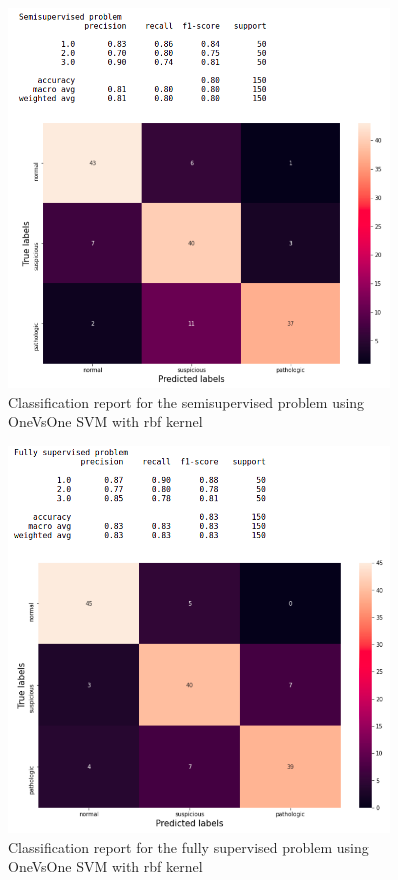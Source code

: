 \documentclass[a4paper,12pt]{article}
\begin{document}
\begin{figure}[H]
  \begin{center}
  \includegraphics[width=0.9\textwidth]{images/semi.png}
  \end{center}
  \caption{Classification report for the semisupervised problem using OneVsOne SVM with rbf kernel}
  \label{fig:semi}
\end{figure}

\begin{figure}[H]
  \begin{center}
  \includegraphics[width=0.9\textwidth]{images/fully.png}
  \end{center}
  \caption{Classification report for the fully supervised problem using OneVsOne SVM with rbf kernel}
  \label{fig:fully}
\end{figure}
\end{document}
